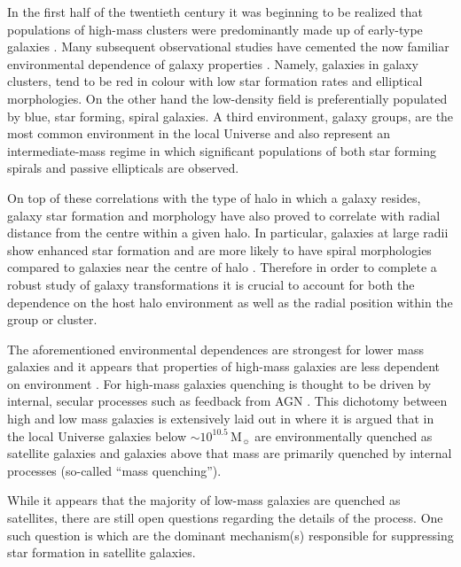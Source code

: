 \documentclass[a4paper,fleqn,usenatbib]{mnras}
\newcommand{\Msun}{\,\mathrm{M_{\sun}}}
\begin{document}
In the first half of the twentieth century it was beginning to be
realized that populations of high-mass clusters were predominantly
made up of early-type galaxies \citep{hubble1931}.  Many subsequent
observational studies have cemented the now
familiar environmental dependence of galaxy properties
\citep[e.g.][]{butcher1978, dressler1980, postman1984, dressler1999,
  blanton2005, wetzel2012}.  Namely, galaxies in galaxy clusters, tend
to be red in colour with low star formation
rates and elliptical morphologies.  On the other hand the
low-density field is preferentially populated by blue, star
forming, spiral galaxies.  A third environment, galaxy groups, are the
most common environment in
the local Universe \citep{geller1983, eke2005} and also represent an
intermediate-mass regime in which significant populations of both
star forming spirals and passive ellipticals are observed.
\par
On top of these correlations with the type of halo in which a galaxy
resides, galaxy star formation and morphology have also proved to
correlate with radial distance from the centre within a given halo.
In particular, galaxies at large radii show enhanced star
formation and are more likely to have spiral morphologies compared to
galaxies near the centre of halo \citep{whitmore1993, goto2003,
  postman2005, rasmussen2012, wetzel2012, fasano2015, haines2015}.  Therefore in
order to complete a robust study of galaxy transformations it is
crucial to account for both the dependence on the host halo environment as
well as the radial position within the group or cluster.
\par
The aforementioned environmental dependences are strongest for lower
mass galaxies and it appears that properties of high-mass galaxies
are less dependent on environment \citep{haines2006, bamford2009}.  For
high-mass galaxies quenching is thought to be driven by internal, secular
processes such as feedback from AGN \citep[e.g.][]{schawinski2009}.  This
dichotomy between high and low mass galaxies is 
extensively laid out in \citet{peng2010} where it is argued that in
the local Universe galaxies below $\sim 10^{10.5}\Msun$ are
environmentally quenched as satellite galaxies and galaxies above that
mass are primarily quenched by internal processes (so-called ``mass
quenching'').
\par
While it appears that the majority of low-mass galaxies are quenched
as satellites, there are still open questions regarding the details of
the process.  One such question is which are the dominant mechanism(s)
responsible for suppressing star formation in satellite galaxies.
\end{document}
